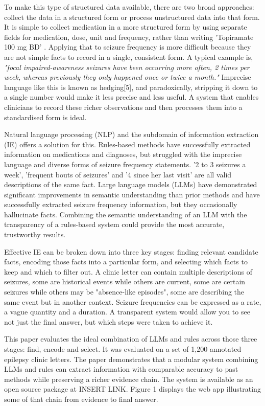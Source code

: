 \documentclass[conference]{IEEEtran}
\begin{document}
To make this type of structured data available, there are
two broad approaches: collect the data in a structured 
form or process unstructured data into that form. It is 
simple to collect medication in a more structured form by 
using separate fields for medication, dose, unit and 
frequency, rather than writing 'Topiramate 100 mg BD' . 
Applying that to seizure frequency is more difficult 
because they are not simple facts to record in a single,
consistent form. A typical example is, \emph{"focal 
impaired-awareness seizures have been occurring 
more often, 2 times per week, whereas previously 
they only happened once or twice a month."} 
Imprecise language like this is known as hedging[5], 
and paradoxically, stripping it down to a single number 
would make it less precise and less useful. A system 
that enables clinicians to record these richer 
observations and then processes them into a 
standardised form is ideal.

Natural language processing (NLP) and the subdomain
of information extraction (IE) offers a solution for this. 
Rules-based methods have successfully extracted
information on medications and diagnoses, but struggled
with the imprecise language and diverse forms
of seizure frequency statements. '2 to 3 seizures a week', 
'frequent bouts of seizures' and '4 since her last visit' are
all valid descriptions of the same fact. Large language 
models (LLMs) have demonstrated significant 
improvements in semantic understanding than prior 
methods and have successfully extracted seizure 
frequency information, but they occasionally hallucinate
facts. Combining the semantic understanding of an LLM
with the transparency of a rules-based system could
provide the most accurate, trustworthy results.

Effective IE can be broken down into three key stages: 
finding relevant candidate facts, encoding those facts 
into a particular form, and selecting which facts to keep 
and which to filter out. A clinic letter can contain multiple 
descriptions of seizures, some are historical events while 
others are current, some are certain seizures while others 
may be "absence-like episodes", some are describing the 
same event but in another context. Seizure frequencies 
can be expressed as a rate, a vague quantity and a 
duration. A transparent system would allow you to see not 
just the final answer, but which steps were taken to achieve 
it.

This paper evaluates the ideal combination of LLMs and 
rules across those three stages: find, encode and 
select. It was evaluated on a set of 1,200 annotated 
epilepsy clinic letters. The paper demonstrates that a 
modular system combining LLMs and rules can extract 
information with comparable accuracy to past methods 
while preserving a richer evidence chain. The system 
is available as an open source package at INSERT LINK.
Figure 1 displays the web app illustrating some of that 
chain from evidence to final answer.
\end{document}
